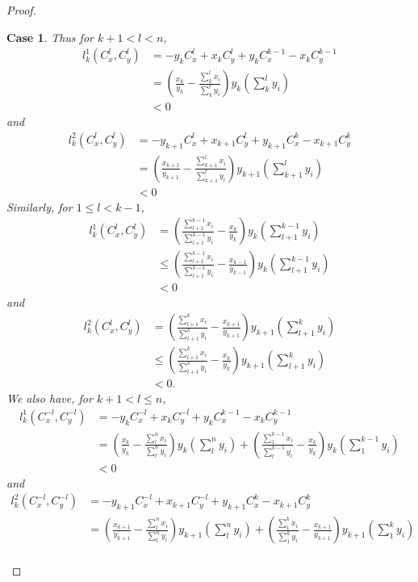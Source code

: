 \documentclass{article}
\theoremstyle{case}
\newtheorem{case}{Case}
\begin{document}
\begin{proof}
\begin{case}
Thus for $k+1 < l < n$,
\begin{align*}
l_k^1\left( C_x^l, C_y^l\right) &= -y_kC_x^l + x_kC_y^l + y_kC_x^{k-1} - x_kC_y^{k-1} \\
&= \left( \frac{x_k}{y_k} - \frac{\sum_k^l x_i}{\sum_k^l y_i}\right)y_k\left( \sum_k^l y_i\right) \\
&< 0
\end{align*}
and
\begin{align*}
l_k^2\left(C_x^l, C_y^l\right) &= -y_{k+1}C_x^l + x_{k+1}C_y^l + y_{k+1}C_x^k - x_{k+1}C_y^k \\
&= \left( \frac{x_{k+1}}{y_{k+1}} - \frac{\sum_{k+1}^l x_i}{\sum_{k+1}^l y_i}\right)y_{k+1}\left( \sum_{k+1}^l y_i\right) \\
&< 0
\end{align*}
Similarly, for $1 \leq l < k-1$,
\begin{align*}
l_k^1\left( C_x^l, C_y^l\right) &= \left( \frac{\sum_{l+1}^{k-1} x_i}{\sum_{l+1}^{k-1} y_i} - \frac{x_k}{y_k}\right)y_k\left( \sum_{l+1}^{k-1} y_i\right) \\
&\leq \left( \frac{\sum_{l+1}^{k-1} x_i}{\sum_{l+1}^{k-1} y_i} - \frac{x_{k-1}}{y_{k-1}}\right)y_k\left( \sum_{l+1}^{k-1} y_i\right) \\
&< 0
\end{align*}
and 
\begin{align*}
l_k^2\left(C_x^l, C_y^l\right) &= \left( \frac{\sum_{l+1}^k x_i}{\sum_{l+1}^k y_i} - \frac{x_{k+1}}{y_{k+1}}\right) y_{k+1}\left(\sum_{l+1}^{k}y_i\right) \\
&\leq \left( \frac{\sum_{l+1}^k x_i}{\sum_{l+1}^k y_i} - \frac{x_k}{y_k}\right) y_{k+1}\left(\sum_{l+1}^{k}y_i\right)\\
&< 0.
\end{align*}
We also have, for $k+1 < l \leq n$,
\begin{align*}
l_k^1\left( C_x^{-l}, C_y^{-l}\right) &= -y_kC_x^{-l} + x_kC_{y}^{-l} + y_kC_x^{k-1} - x_kC_y^{k-1} \\
&= \left( \frac{x_k}{y_k} - \frac{\sum_l^n x_i}{\sum_l^n y_i}\right)y_k \left( \sum_l^n y_i\right) + \left( \frac{\sum_1^{k-1} x_i}{\sum_l^{k-1}y_i} - \frac{x_k}{y_k}\right)y_k \left( \sum_1^{k-1}y_i\right) \\
&< 0
\end{align*}
and
\begin{align*}
l_k^2\left( C_x^{-l}, C_y^{-l}\right) &= -y_{k+1}C_x^{-l} + x_{k+1}C_y^{-l} + y_{k+1}C_x^k - x_{k+1}C_y^k \\
&= \left( \frac{x_{k+1}}{y_{k+1}} - \frac{\sum_l^n x_i}{\sum_l^n y_i}\right)y_{k+1}\left(\sum_l^n y_i\right) + \left( \frac{\sum_1^k x_i}{\sum_1^k y_i} - \frac{x_{k+1}}{y_{k+1}}\right)y_{k+1}\left(\sum_1^k y_i\right) \\

\end{align*}
\end{case}
\end{proof}
\end{document}
